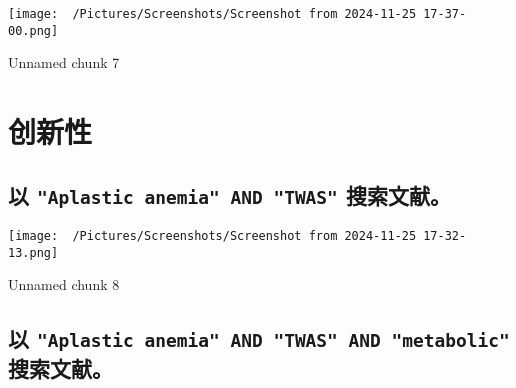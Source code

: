 \documentclass[
]{article}
\begin{document}
\begin{center}\vspace{1.5cm}\end{center}
\def\@captype{figure}
\begin{center}
\texttt{[image: ~/Pictures/Screenshots/Screenshot from 2024-11-25 17-37-00.png]}
\caption{Unnamed chunk 7}\label{fig:unnamed-chunk-7}
\end{center}

\begin{center}\vspace{1.5cm}\end{center}

\hypertarget{results}{%
\section{创新性}\label{results}}

\hypertarget{ux4ee5-aplastic-anemia-and-twas-ux641cux7d22ux6587ux732e}{%
\subsection{\texorpdfstring{以 \texttt{"Aplastic\ anemia"\ AND\ "TWAS"} 搜索文献。}{以 "Aplastic anemia" AND "TWAS" 搜索文献。}}\label{ux4ee5-aplastic-anemia-and-twas-ux641cux7d22ux6587ux732e}}

\begin{center}\vspace{1.5cm}\end{center}
\def\@captype{figure}
\begin{center}
\texttt{[image: ~/Pictures/Screenshots/Screenshot from 2024-11-25 17-32-13.png]}
\caption{Unnamed chunk 8}\label{fig:unnamed-chunk-8}
\end{center}

\begin{center}\vspace{1.5cm}\end{center}

\hypertarget{ux4ee5-aplastic-anemia-and-twas-and-metabolic-ux641cux7d22ux6587ux732e}{%
\subsection{\texorpdfstring{以 \texttt{"Aplastic\ anemia"\ AND\ "TWAS"\ AND\ "metabolic"} 搜索文献。}{以 "Aplastic anemia" AND "TWAS" AND "metabolic" 搜索文献。}}\label{ux4ee5-aplastic-anemia-and-twas-and-metabolic-ux641cux7d22ux6587ux732e}}
\end{document}
